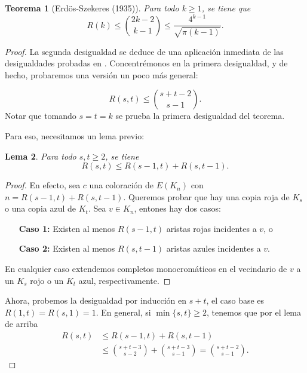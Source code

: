 \documentclass[12pt]{report}
\theoremstyle{plain}
\newtheorem{theorem}{Teorema}[section]
\newtheorem{lemma}[theorem]{Lema}
\theoremstyle{definition}
\begin{document}
\begin{theorem}[Erdös-Szekeres (1935)]
Para todo $k \geq 1$, se tiene que
\[
    R(k) \leq \binom{2k-2}{k-1} \leq \frac{4^{k-1}}{\sqrt {\pi (k-1)}}.
\]
\end{theorem}
\begin{proof}
La segunda desigualdad se deduce de una aplicación inmediata de las desigualdades probadas en \cite{herbertRobbins1955}. Concentrémonos en la primera desigualdad, y de hecho, probaremos una versión un poco más general:

\[
    R(s,t) \leq \binom{s + t - 2}{s-1}.
\]
Notar que tomando $s = t = k$ se prueba la primera desigualdad del teorema.

Para eso, necesitamos un lema previo:
\begin{lemma}
Para todo $s,t \geq 2$, se tiene
\[
    R(s,t) \leq R(s-1, t) + R(s,t-1).
\]
\end{lemma}
\begin{proof}
En efecto, sea $c$ una coloración de $E(K_n)$ con $n = R(s-1,t) + R(s,t-1)$. Queremos probar que hay una copia roja de $K_s$ o una copia azul de $K_t$. Sea $v \in K_n$, entones hay dos casos:
\begin{enumerate}
\item[\textbf{Caso 1:}] Existen al menos $R(s-1,t)$ aristas rojas incidentes a $v$, o
\item[\textbf{Caso 2:}] Existen al menos $R(s,t-1)$ aristas azules incidentes a $v$.
\end{enumerate}
En cualquier caso extendemos completos monocromáticos en el vecindario de $v$ a un $K_s$ rojo o un $K_t$ azul, respectivamente.
\end{proof}

Ahora, probemos la desigualdad por inducción en $s+t$, el caso base es $R (1,t) = R(s,1) = 1$. En general, si $\min \{s,t\} \geq 2$, tenemos que por el lema de arriba
\begin{align*}
    R(s,t) &\leq R(s-1,t) + R(s,t-1) \\
        &\leq  \binom{s + t -3}{s-2} + \binom{s+t-3}{s-1} = \binom { s+ t -2 }{s-1}.
\end{align*}

\end{proof}
\end{document}
